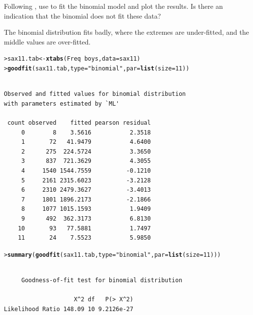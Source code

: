 \documentclass[10pt]{report}\usepackage[]{graphicx}\usepackage[]{color}
\makeatletter
\newcommand{\hlnum}[1]{\textcolor[rgb]{0.686,0.059,0.569}{#1}}%
\newcommand{\hlstr}[1]{\textcolor[rgb]{0.192,0.494,0.8}{#1}}%
\newcommand{\hlopt}[1]{\textcolor[rgb]{0,0,0}{#1}}%
\newcommand{\hlstd}[1]{\textcolor[rgb]{0.345,0.345,0.345}{#1}}%
\newcommand{\hlkwb}[1]{\textcolor[rgb]{0.69,0.353,0.396}{#1}}%
\newcommand{\hlkwc}[1]{\textcolor[rgb]{0.333,0.667,0.333}{#1}}%
\newcommand{\hlkwd}[1]{\textcolor[rgb]{0.737,0.353,0.396}{\textbf{#1}}}%
\newenvironment{kframe}{%
 \def\at@end@of@kframe{}%
 \ifinner\ifhmode%
  \def\at@end@of@kframe{\end{minipage}}%
  \begin{minipage}{\columnwidth}%
 \fi\fi%
 \def\FrameCommand##1{\hskip\@totalleftmargin \hskip-\fboxsep
 \colorbox{shadecolor}{##1}\hskip-\fboxsep
     \hskip-\linewidth \hskip-\@totalleftmargin \hskip\columnwidth}%
 \MakeFramed {\advance\hsize-\width
   \@totalleftmargin\z@ \linewidth\hsize
   \@setminipage}}%
 {\par\unskip\endMakeFramed%
 \at@end@of@kframe}
\newenvironment{knitrout}{}{} %
\renewenvironment{knitrout}{\small\renewcommand{\baselinestretch}{.85}}{} %
\makeatother
\begin{document}
\begin{Exercises}
\begin{enumerate*}
    \item Following , use  to fit the binomial model and plot the
    results.  Is there an indication that the binomial does not fit these data?
    \begin{ans}
    The binomial distribution fits badly, where the extremes are under-fitted, and the middle
    values are over-fitted.
\begin{knitrout}\footnotesize
{}\color{fgcolor}\begin{kframe}
\begin{alltt}
\hlstd{> }\hlstd{sax11.tab} \hlkwb{<-} \hlkwd{xtabs}\hlstd{(Freq} \hlopt{~} \hlstd{boys,} \hlkwc{data}\hlstd{=sax11)}
\hlstd{> }\hlkwd{goodfit}\hlstd{(sax11.tab,} \hlkwc{type}\hlstd{=}\hlstr{"binomial"}\hlstd{,} \hlkwc{par}\hlstd{=}\hlkwd{list}\hlstd{(}\hlkwc{size}\hlstd{=}\hlnum{11}\hlstd{))}
\end{alltt}
\begin{verbatim}

Observed and fitted values for binomial distribution
with parameters estimated by `ML' 

 count observed    fitted pearson residual
     0        8    3.5616           2.3518
     1       72   41.9479           4.6400
     2      275  224.5724           3.3650
     3      837  721.3629           4.3055
     4     1540 1544.7559          -0.1210
     5     2161 2315.6023          -3.2128
     6     2310 2479.3627          -3.4013
     7     1801 1896.2173          -2.1866
     8     1077 1015.1593           1.9409
     9      492  362.3173           6.8130
    10       93   77.5881           1.7497
    11       24    7.5523           5.9850
\end{verbatim}
\begin{alltt}
\hlstd{> }\hlkwd{summary}\hlstd{(}\hlkwd{goodfit}\hlstd{(sax11.tab,} \hlkwc{type}\hlstd{=}\hlstr{"binomial"}\hlstd{,} \hlkwc{par}\hlstd{=}\hlkwd{list}\hlstd{(}\hlkwc{size}\hlstd{=}\hlnum{11}\hlstd{)))}
\end{alltt}
\begin{verbatim}

	 Goodness-of-fit test for binomial distribution

                    X^2 df   P(> X^2)
Likelihood Ratio 148.09 10 9.2126e-27
\end{verbatim}
\end{kframe}
\end{knitrout}
    \end{ans}
    

\end{enumerate*}
\end{Exercises}
\end{document}
